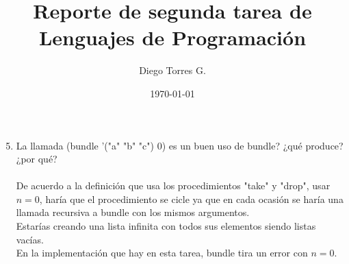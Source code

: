 \documentclass[12pt]{article}
\begin{document}
\title{Reporte de segunda tarea de Lenguajes de Programaci\'on}
\author{Diego Torres G.}
\date{\today}

\maketitle

\begin{enumerate}
\setcounter{enumi}{4}

		\item{La llamada (bundle '("a" "b" "c") 0) es un buen uso de bundle? ¿qu\'e produce? ¿por qu\'e?}\\\\
				De acuerdo a la definici\'on que usa los procedimientos "take" y "drop", usar $n = 0$, har\'ia que el procedimiento se cicle ya que en cada ocasi\'on se
				har\'ia una llamada recursiva a bundle con los mismos argumentos.\\

				Estar\'ias creando una lista infinita con todos sus elementos siendo listas vac\'ias.\\

				En la implementaci\'on que hay en esta tarea, bundle tira un error con $n = 0$.\\
\end{enumerate}
\end{document}
